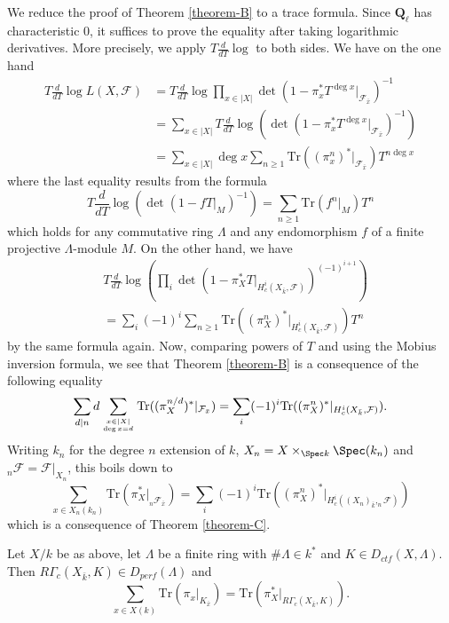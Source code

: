 \noindent
We reduce the proof of Theorem \ref{theorem-B} to a trace formula. Since
$\mathbf{Q}_\ell$ has characteristic 0, it suffices to prove the equality after
taking logarithmic derivatives. More precisely, we apply $T\frac{d}{dT} \log$
to both sides. We have on the one hand
\begin{align*}
T \frac{d}{dT} \log L(X, \mathcal{F})
& =
T\frac{d}{dT} \log
\prod_{x \in |X|} \det(1 - \pi_x^* T^{\deg x} |_{\mathcal{F}_{\bar x}})^{-1} \\
& =
\sum_{x \in |X|} T \frac{d}{dT} \log
( \det(1 - \pi_x^* T^{\deg x} |_{\mathcal{F}_{\bar x}})^{-1}) \\
& =
\sum_{x \in |X|} \deg x
\sum_{n \geq 1} \text{Tr}((\pi_x^n)^* |_{\mathcal{F}_{\bar x}}) T^{n\deg x}
\end{align*}
where the last equality results from the formula
$$
T\frac{d}{dT}\log\left(\det\left(1-fT|_M\right)^{-1}\right) = \sum_{n\geq 1}
\text{Tr}(f^n|_M)T^n
$$
which holds for any commutative ring $\Lambda$ and any endomorphism $f$ of a
finite projective $\Lambda$-module $M$. On the other hand, we have
\begin{align*}
& T\frac{d}{dT} \log\left(
\prod\nolimits_i
\det(1-\pi_X^*T |_{H_c^i\left(X_{\bar k} , \mathcal{F}\right)})^{(-1)^{i+1}}
\right) \\
& =
\sum\nolimits_i (-1)^i \sum\nolimits_{n \geq 1}
\text{Tr}\left((\pi_X^n)^* |_{H_c^i(X_{\bar k},\mathcal{F})}\right) T^n
\end{align*}
by the same formula again. Now, comparing powers of $T$ and using the Mobius
inversion formula, we see that Theorem \ref{theorem-B} is a consequence of the
following equality
$$
\sum_{d | n} d \sum_{x \in |X| \atop \deg x = d}
\text{Tr}((\pi_X^{n/d})^* |_{\mathcal{F}_{\bar x}}) =
\sum_i (-1)^i \text{Tr}((\pi^n_X)^* |_{H^i_c(X_{\bar k}, \mathcal{F})}).
$$
Writing $k_n$ for the degree $n$ extension of $k$,
$X_n = X \times_{\Spec k} \Spec(k_n)$ and
$_n\mathcal{F} = \mathcal{F}|_{X_n}$, this boils down
to
$$
\sum_{x \in X_n(k_n)} \text{Tr}(\pi_X^* |_{_n\mathcal{F}_{\bar x}})
=
\sum_i (-1)^i \text{Tr}((\pi^n_X)^* |_{H^i_c({(X_n)}_{\bar k}, _n\mathcal{F})})
$$
which is a consequence of Theorem \ref{theorem-C}.



\begin{theorem}
\label{theorem-D}
Let $X/k$ be as above, let $\Lambda$ be a finite ring with $\#\Lambda \in k^*$
and $K\in D_{ctf}(X, \Lambda)$. Then $R\Gamma_c(X_{\bar k}, K)\in
D_{perf}(\Lambda)$ and
$$
\sum_{x\in X(k)}\text{Tr}\left(\pi_x |_{K_{\bar x}}\right) =
\text{Tr}\left(\pi_X^* |_{R\Gamma_c(X_{\bar k}, K )}\right).
$$
\end{theorem}

